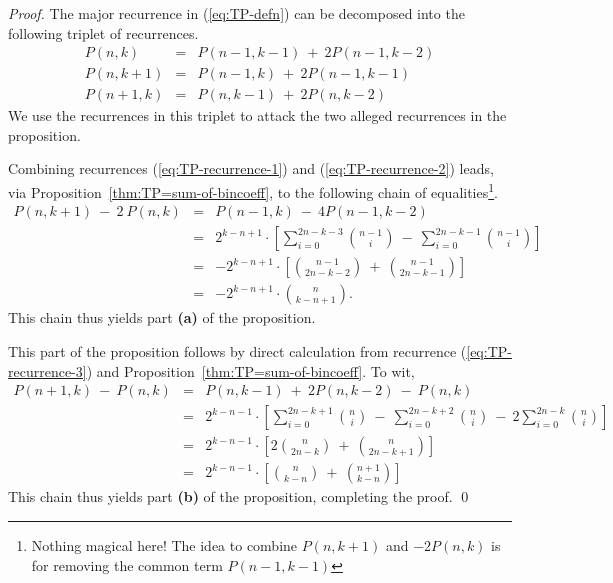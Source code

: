 \begin{proof}
The major recurrence in (\ref{eq:TP-defn}) can be decomposed into the following triplet of recurrences.
\begin{eqnarray}
\label{eq:TP-recurrence-1}
P(n, k)   & = & P(n-1, k-1) \ + \ 2 P(n-1, k-2) \\
\label{eq:TP-recurrence-2}
P(n, k+1) & = & P(n-1, k) \ + \ 2 P(n-1, k-1) \\
\label{eq:TP-recurrence-3}
P(n+1, k) & = & P(n, k-1) \ + \ 2 P(n, k-2)
\end{eqnarray}
We use the recurrences in this triplet to attack the two alleged recurrences in the proposition.

\medskip

Combining recurrences (\ref{eq:TP-recurrence-1}) and (\ref{eq:TP-recurrence-2}) leads, via
Proposition~\ref{thm:TP=sum-of-bincoeff}, to the following chain of equalities\footnote{Nothing magical here! The idea to combine $P(n, k+1)$ and $-2 P(n, k)$ is for removing the common term $P(n-1, k-1)$}.
\begin{eqnarray*}
P(n, k+1) \ - \ 2 \ P(n, k)
  & = &
P(n-1, k) \ - \ 4 P(n-1, k-2) \\
  & = &
2^{k-n+1} \cdot \left[
\sum_{i=0}^{2n-k-3} {{n-1} \choose i} \ - \
\sum_{i=0}^{2n-k-1} {{n-1} \choose i}
\right] \\
  & = & 
- 2^{k-n+1} \cdot \left[
{{n-1} \choose {2n-k-2}} \ + \ {{n-1} \choose {2n-k-1}}
\right] \\
  & = &
- 2^{k-n+1} \cdot {n \choose k-n+1}.
\end{eqnarray*}
This chain thus yields part {\bf (a)} of the proposition.

\bigskip

This part of the proposition follows by direct calculation from recurrence (\ref{eq:TP-recurrence-3}) and Proposition~\ref{thm:TP=sum-of-bincoeff}.  To wit,
\begin{eqnarray*}
P(n+1, k) \ - \ P(n, k)
  & = &
P(n, k-1) \ + \ 2 P(n, k-2) \ - \ P(n,k) \\
  & = &
2^{k-n-1} \cdot \left[
\sum_{i=0}^{2n-k+1} {n \choose i}
 \ - \ \sum_{i=0}^{2n-k+2} {n \choose i}
 \ - \ 2 \sum_{i=0}^{2n-k} {n \choose i}
\right] \\
  & = & 
2^{k-n-1} \cdot \left[
  2 {n \choose {2n-k}} \ + \ {n \choose {2n-k+1}} \right] \\
  & = &
2^{k-n-1} \cdot \left[
   {n \choose {k-n}} \ + \ {{n+1} \choose {k-n}} \right]
\end{eqnarray*}
This chain thus yields part {\bf (b)} of the proposition, completing the proof.  \qed
\end{proof}

